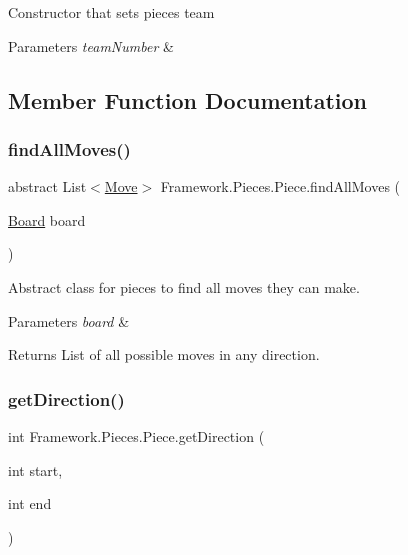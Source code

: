 Constructor that sets piece\textquotesingle{}s team


\begin{DoxyParams}{Parameters}
{\em team\+Number} & \\
\hline
\end{DoxyParams}


\subsection{Member Function Documentation}
\hypertarget{class_framework_1_1_pieces_1_1_piece_a1572fe9000efc0a075e143dea8cba7c2}{}\label{class_framework_1_1_pieces_1_1_piece_a1572fe9000efc0a075e143dea8cba7c2} 
\subsubsection{\texorpdfstring{find\+All\+Moves()}{findAllMoves()}}
{\footnotesize\ttfamily abstract List$<$\hyperlink{class_framework_1_1_move}{Move}$>$ Framework.\+Pieces.\+Piece.\+find\+All\+Moves (\begin{DoxyParamCaption}\item[{\hyperlink{class_framework_1_1_board}{Board}}]{board }\end{DoxyParamCaption})\hspace{0.3cm}{\ttfamily [abstract]}}

Abstract class for pieces to find all moves they can make. 
\begin{DoxyParams}{Parameters}
{\em board} & \\
\hline
\end{DoxyParams}
\begin{DoxyReturn}{Returns}
List of all possible moves in any direction. 
\end{DoxyReturn}
\hypertarget{class_framework_1_1_pieces_1_1_piece_ac9f72701fd35b1bef9ea3e42f648936b}{}\label{class_framework_1_1_pieces_1_1_piece_ac9f72701fd35b1bef9ea3e42f648936b} 
\subsubsection{\texorpdfstring{get\+Direction()}{getDirection()}}
{\footnotesize\ttfamily int Framework.\+Pieces.\+Piece.\+get\+Direction (\begin{DoxyParamCaption}\item[{int}]{start,  }\item[{int}]{end }\end{DoxyParamCaption})}

